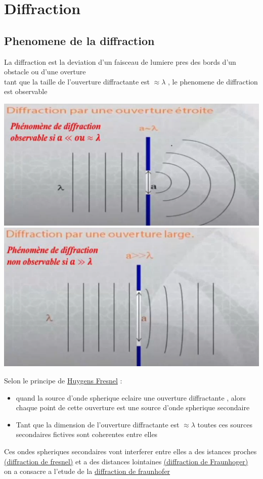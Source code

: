 \documentclass[12pt]{book}
\begin{document}
    \chapter{Diffraction}
        \section{Phenomene de la diffraction}
            La diffraction est la deviation d'un faisceau de lumiere pres des bords d'un obstacle ou d'une overture \\
            tant que la taille de l'ouverture diffractante est $\approx \lambda$ , le phenomene de diffraction est observable 
            \begin{center}
                \includegraphics[width=0.4\linewidth]{pic/diffraction1.png}
                \includegraphics[width=0.4\linewidth]{pic/diffraction2.png}
            \end{center}
            Selon le principe de \underline{Huygens Fresnel} :
                \begin{itemize}
                    \item quand la source d'onde spherique eclaire une ouverture diffractante , alors chaque point de cette ouverture  est une source d'onde spherique secondaire 
                    \item Tant que la dimension de l'ouverture diffractante est $\approx \lambda $ toutes ces sources secondaires fictives sont coherentes entre elles  
                \end{itemize}
            Ces ondes spheriques secondaires vont interferer entre elles a des istances proches \underline{(diffraction de fresnel)} et a des  distances lointaines \underline{ (diffraction de Fraunhoger)} \\
            on a consacre a l'etude de la \underline{diffraction de fraunhofer}
\end{document}
